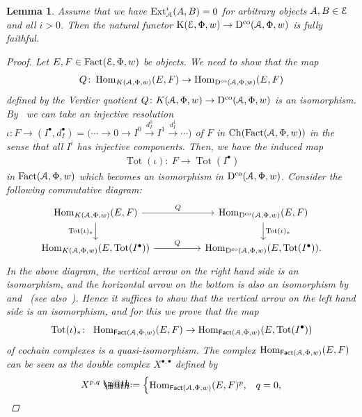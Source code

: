 \documentclass[11pt]{article}
\makeatletter
\numberwithin{equation}{section}
\newtheorem{lem}[dfn]{Lemma}
\newcommand*{\defeq}{\mathrel{\rlap{%
 \raisebox{0.3ex}{$\m@th\cdot$}}%
 \raisebox{-0.3ex}{$\m@th\cdot$}}%
 =}
\numberwithin{equation}{section}
\newcommand{\Ch}{\operatorname{Ch}}
\newcommand{\Fact}{\operatorname{Fact}}
\newcommand{\dgFact}{\operatorname{\sf{Fact}}}
\newcommand{\Hom}{\operatorname{Hom}}
\newcommand{\Ext}{\operatorname{Ext}}
\newcommand{\Tot}{\operatorname{Tot}}
\newcommand{\Dco}{\operatorname{D^{co}}}
\newcommand{\K}{\operatorname{K}}
\newcommand{\scrA}{\EuScript{A}}
\newcommand{\scrE}{\EuScript{E}}
\makeatother
\begin{document}
\begin{lem}\label{add ff}
Assume that we have $\Ext^i_{\scrA}(A,B)=0$ for arbitrary objects $A,B\in \scrE$ and all $i>0$. Then the natural functor $\K(\scrE,\Phi,w)\to \Dco(\scrA,\Phi,w)$ is fully faithful.
\begin{proof}
Let $E,F\in \Fact(\scrE,\Phi,w)$ be objects. We need to show that the map
\begin{gather*}
Q\colon\Hom_{{\rm K}(\scrA,\Phi,w)}(E,F)\to \Hom_{\Dco(\scrA,\Phi,w)}(E,F)
\end{gather*}
 defined by the Verdier quotient $Q\colon{\rm K}(\scrA,\Phi,w)\to\Dco(\scrA,\Phi,w)$ is an isomorphism. By~\cite[Proposition~2.19]{bdfik} we can take an injective resolution $\iota\colon F\to (I^{\bullet},d_{I}^{\bullet})=\big(\cdots\to0\to I^0\xrightarrow{d_{I}^0} I^1\xrightarrow{d_{I}^1} \cdots\big)$ of $F$ in $\Ch(\Fact(\scrA,\Phi,w))$ in the sense that all $I^i$ has injective components. Then, we have the induced map
 \begin{gather*}
 \Tot(\iota)\colon\ F\to\Tot(I^{\bullet})
 \end{gather*}
 in $\Fact(\scrA,\Phi,w)$ which becomes an isomorphism in $\Dco(\scrA,\Phi,w)$. Consider the following commutative diagram:
\[
\begin{tikzcd}
\Hom_{{\rm K}(\scrA,\Phi,w)}(E,F)\arrow[rr, "Q"]\arrow[d, "\Tot(\iota)_*"']&&\Hom_{\Dco(\scrA,\Phi,w)}(E,F)\arrow[d, "\Tot(\iota)_*"]\\
\Hom_{{\rm K}(\scrA,\Phi,w)}(E,\Tot(I^{\bullet}))\arrow[rr, "Q"]&&\Hom_{\Dco(\scrA,\Phi,w)}(E,\Tot(I^{\bullet})).
\end{tikzcd}
\]
In the above diagram, the vertical arrow on the right hand side is an isomorphism, and the horizontal arrow on the bottom is also an isomorphism by~\cite[Lemma~2.24]{bdfik} and~\cite[Proposition~B.2(I)]{ls} (see also~\cite[Remark 2.14]{ls}). Hence it suffices to show that the vertical arrow on the left hand side is an isomorphism, and for this we prove that the map
\begin{equation}\label{hom cpx}
\Tot(\iota)_*\colon\ \Hom_{\dgFact(\scrA,\Phi,w)}(E,F) \to\Hom_{\dgFact(\scrA,\Phi,w)}(E,\Tot(I^{\bullet}))
\end{equation}
of cochain complexes is a quasi-isomorphism. The complex $\Hom_{\dgFact(\scrA,\Phi,w)}(E,F)$ can be seen as the double complex $X^{\bullet,\bullet}$ defined by
\begin{equation*}
X^{p,q}\defeq\begin{cases}
\Hom_{\dgFact(\scrA,\Phi,w)}(E,F)^p, & q=0, \\

\end{cases}
\end{equation*}
\end{proof}
\end{lem}
\end{document}
